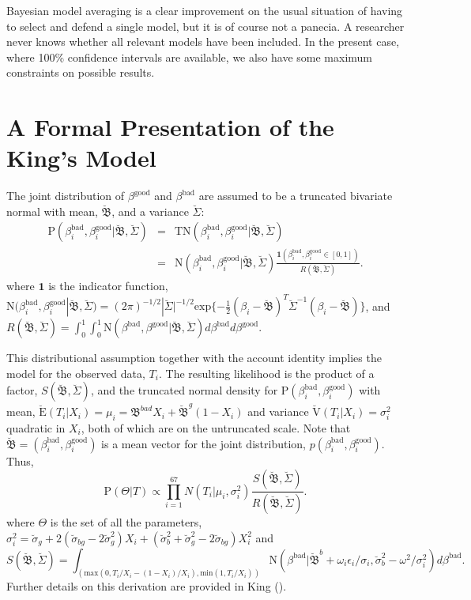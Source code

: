 \documentclass[11pt,titlepage]{article}
\newcommand{\bbeta}{{\mathfrak B}}
\newcommand{\bbetau}{\breve{\mathfrak B}}
\newcommand{\sigmau}{\breve{\sigma}}
\newcommand{\Sigmau}{\breve{\Sigma}}
\newcommand{\Eu}{\breve{\text{E}}}
\newcommand{\Vu}{\breve{\text{V}}}
\newcommand{\TN}{\text{TN}}
\newcommand{\N}{\text{N}}
\renewcommand{\P}{\text{P}}
\newcommand{\bb}{\beta^{\text{bad}}}
\newcommand{\bg}{\beta^{\text{good}}}
\begin{document}
Bayesian model averaging is a clear improvement on the usual situation
of having to select and defend a single model, but it is of course not
a panecia. A researcher never knows whether all relevant models have
been included.  In the present case, where 100\% confidence intervals
are available, we also have some maximum constraints on possible results.

\appendix
\section{A Formal Presentation of the King's Model} \label{appx:king}

The joint distribution of $\bg$ and $\bb$ are assumed to be a
truncated bivariate normal with mean, $\bbetau$, and a variance
$\Sigmau$:
\begin{eqnarray}
\P(\bb_i, \bg_i | \bbetau, \Sigmau) & = & 
\TN (\bb_i,\bg_i | \bbetau, \Sigmau) \\
& = & \N (\bb_i, \bg_i | \bbetau, \Sigmau)
\frac{\mathbf{1}(\bb_i, \bg_i \in [0,1])}
{R(\bbetau, \Sigmau)}.
\end{eqnarray}
where $\mathbf{1}$ is the indicator function, $\N (\bb_i,
\bg_i | \bbetau, \Sigmau) = (2 \pi)^{-1/2} |\Sigmau|^{-1/2}
\text{exp} \{ - \frac{1}{2} (\beta_i-\bbetau)^T \Sigmau^{-1} (\beta_i
- \bbetau) \}$, and $R (\bbetau, \Sigmau) = \int_0^1 \int_0^1 \N
(\bb, \bg | \bbetau, \Sigmau) d\bb
d\bg$.

This distributional assumption together with the account identity
implies the model for the observed data, $T_i$. The resulting
likelihood is the product of a factor, $S(\bbetau, \Sigmau)$, and the
truncated normal density for $\P(\bb_i, \bg_i)$ with
mean, $\Eu(T_i|X_i) = \mu_i = \bbeta^{bad} X_i + \bbetau^g (1-X_i)$
and variance $\Vu(T_i|X_i) = \sigma^2_i$ quadratic in $X_i$, both of
which are on the untruncated scale. Note that $\bbetau=(\bb_i,
\bg_i)$ is a mean vector for the joint distribution,
$p(\bb_i, \bg_i)$. Thus,
\begin{equation}
\P(\Theta|T) \propto \prod_{i=1}^{67} N(T_i|\mu_i, \sigma_i^2)
\frac{S(\bbetau, \Sigmau)}{R(\bbetau, \Sigmau)}. \label{eq:likelihood}
\end{equation} 
where $\Theta$ is the set of all the parameters, $\sigma_i^2=\sigmau_g
+ 2(\sigmau_{bg} - 2 \sigmau_g^2) X_i + (\sigmau_b^2 + \sigmau_g^2 -
2\sigmau_{bg}) X_i^2$ and 
$$S(\bbetau, \Sigmau)=\int_{(\text{max}(0, T_i/X_i-(1-X_i)/X_i),
  \text{min}(1,T_i/X_i))} \N(\bb|\bbetau^b + \omega_i \epsilon_i /
\sigma_i, \sigmau^2_b-\omega^2/\sigma^2_i)d\bb .$$
Further details on
this derivation are provided in King (\citeyear[Ch.\ 7]{king:97}).
\end{document}
